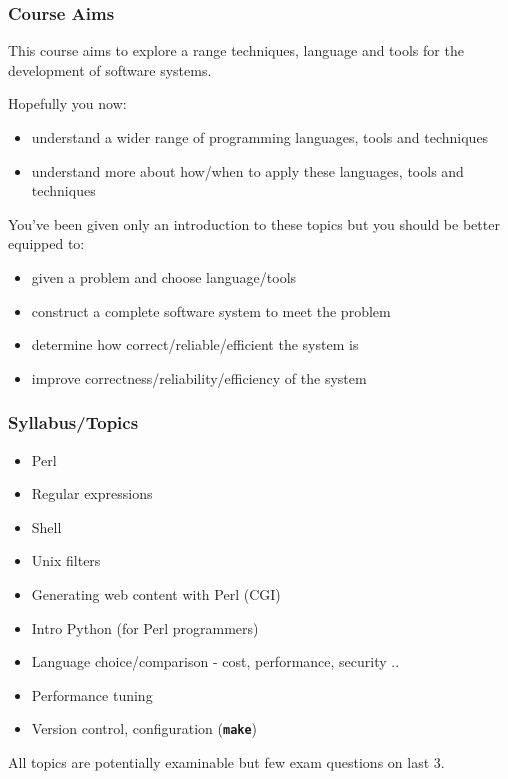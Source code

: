 \begin{frame}
\frametitle{Course Aims}
This course aims to explore a range techniques, language and tools 
for the development of software systems.

Hopefully you now:
\begin{itemize}
\item 
understand a wider range of programming languages, tools and techniques
\item 
understand more about how/when to apply these languages, tools and techniques
\end{itemize}
You've been given only an introduction to these topics
but you should be better equipped to:
\begin{itemize}
\item 
given a problem and choose language/tools
\item 
construct a complete software system to meet the problem
\item 
determine how correct/reliable/efficient the system is
\item 
improve correctness/reliability/efficiency of the system
\end{itemize}
\end{frame}

\begin{frame}
\frametitle{Syllabus/Topics}
\begin{itemize}
\item  Perl
\item  Regular expressions
\item  Shell
\item  Unix filters
\item  Generating  web content with Perl (CGI)
\item  Intro Python (for Perl programmers)
\item  Language choice/comparison  - cost, performance, security ..
\item  Performance tuning
\item  Version control, configuration (\textbf{\tt{make}})
\end{itemize}

All topics are potentially examinable but few exam questions on last 3.

\end{frame}

